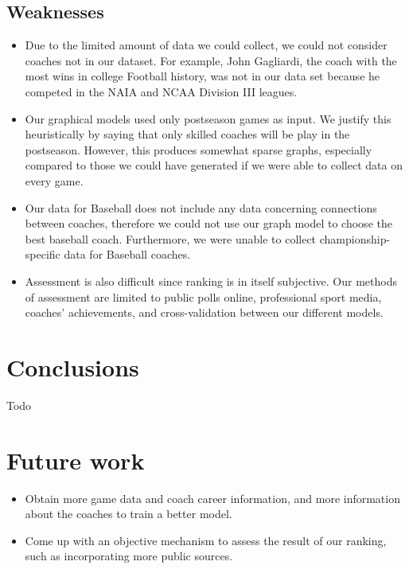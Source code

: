 \documentclass[titlepage,12pt]{article}
\begin{document}
\subsection{Weaknesses}
\begin{itemize}
\item Due to the limited amount of data we could collect, we could not consider coaches not in our dataset. For example, John Gagliardi, the coach with the most wins in college Football history, was not in our data set because he competed in the NAIA and NCAA Division III leagues. 

\item Our graphical models used only postseason games as input. We justify this heuristically by saying that only skilled coaches will be play in the postseason. However, this produces somewhat sparse graphs, especially compared to those we could have generated if we were able to collect data on every game.

\item Our data for Baseball does not include any data concerning connections between coaches, therefore we could not use our graph model to choose the best baseball coach. Furthermore, we were unable to collect championship-specific data for Baseball coaches.

\item Assessment is also difficult since ranking is in itself subjective. Our methods of assessment are limited to public polls online, professional sport media, coaches' achievements, and cross-validation between our different models.

\end{itemize}

\section{Conclusions}
Todo

\section{Future work}
\begin{itemize}
\item Obtain more game data and coach career information, and more information about the coaches to train a better model.

\item Come up with an objective mechanism to assess the result of our ranking, such as incorporating more public sources.
\end{itemize}
\end{document}
